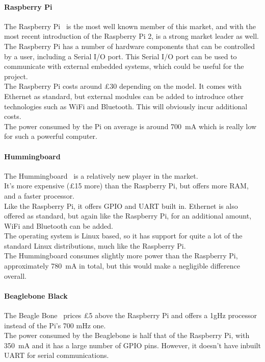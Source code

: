 \documentclass[preprint,12pt,3p]{elsarticle}
\begin{document}
\paragraph{Raspberry Pi}
The Raspberry Pi~\cite{raspberrypi} is the most well known member of this market, and with the most recent introduction of the Raspberry Pi 2, is a strong market leader as well.\\
The Raspberry Pi has a number of hardware components that can be controlled by a user, including a Serial I/O port. This Serial I/O port can be used to communicate with external embedded systems, which could be useful for the project.\\
The Raspberry Pi costs around \pounds30 depending on the model. It comes with Ethernet as standard, but external modules can be added to introduce other technologies such as WiFi and Bluetooth. This will obviously incur additional costs.\\
The power consumed by the Pi on average is around \SI{700}{\milli\ampere} which is really low for such a powerful computer.

\paragraph{Hummingboard}
The Hummingboard~\cite{hummingboard} is a relatively new player in the market.\\
It's more expensive (\pounds15 more) than the Raspberry Pi, but offers more RAM, and a faster processor.\\
Like the Raspberry Pi, it offers GPIO and UART built in. Ethernet is also offered as standard, but again like the Raspberry Pi, for an additional amount, WiFi and Bluetooth can be added.\\
The operating system is Linux based, so it has support for quite a lot of the standard Linux distributions, much like the Raspberry Pi.\\
The Hummingboard consumes slightly more power than the Raspberry Pi, approximately \SI{780}{\milli\ampere} in total, but this would make a negligible difference overall.
\paragraph{Beaglebone Black}
The Beagle Bone~\cite{beaglebone} prices \pounds5 above the Raspberry Pi and offers a 1gHz processor instead of the Pi's 700 mHz one.\\

The power consumed by the Beaglebone is half that of the Raspberry Pi, with \SI{350}{\milli\ampere} and it has a large number of GPIO pins. However, it doesn't have inbuilt UART for serial communications.\\
\end{document}
